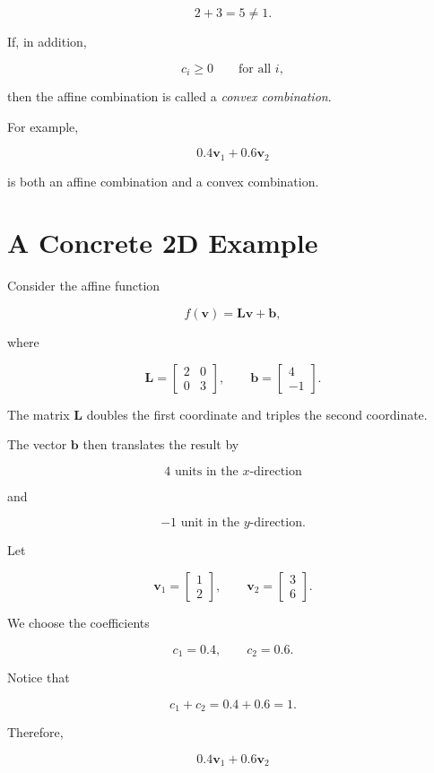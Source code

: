 \documentclass[12pt]{article}
\newcommand{\Matrix}[1]{\mathbf{#1}}
\newcommand{\Vector}[1]{\mathbf{#1}}
\begin{document}
\[
    2+3=5\neq1.
\]

If, in addition,

\[
    c_i\geq0
    \qquad\text{for all }i,
\]

then the affine combination is called a
\emph{convex combination}.

For example,

\[
    0.4\Vector{v}_1+0.6\Vector{v}_2
\]

is both an affine combination and a convex combination.

\section{A Concrete 2D Example}
Consider the affine function

\[
    f(\Vector{v})
    =
    \Matrix{L}\Vector{v}+\Vector{b},
\]

where

\[
\Matrix{L}
=
\begin{bmatrix}
2 & 0\\
0 & 3
\end{bmatrix},
\qquad
\Vector{b}
=
\begin{bmatrix}
4\\
-1
\end{bmatrix}.
\]

The matrix $\Matrix{L}$ doubles the first coordinate and triples
the second coordinate.

The vector $\Vector{b}$ then translates the result by

\[
4 \text{ units in the }x\text{-direction}
\]

and

\[
-1 \text{ unit in the }y\text{-direction}.
\]

Let

\[
\Vector{v}_1
=
\begin{bmatrix}
1\\
2
\end{bmatrix},
\qquad
\Vector{v}_2
=
\begin{bmatrix}
3\\
6
\end{bmatrix}.
\]

We choose the coefficients

\[
    c_1=0.4,
    \qquad
    c_2=0.6.
\]

Notice that

\[
    c_1+c_2=0.4+0.6=1.
\]

Therefore,

\[
    0.4\Vector{v}_1+0.6\Vector{v}_2
\]
\end{document}
